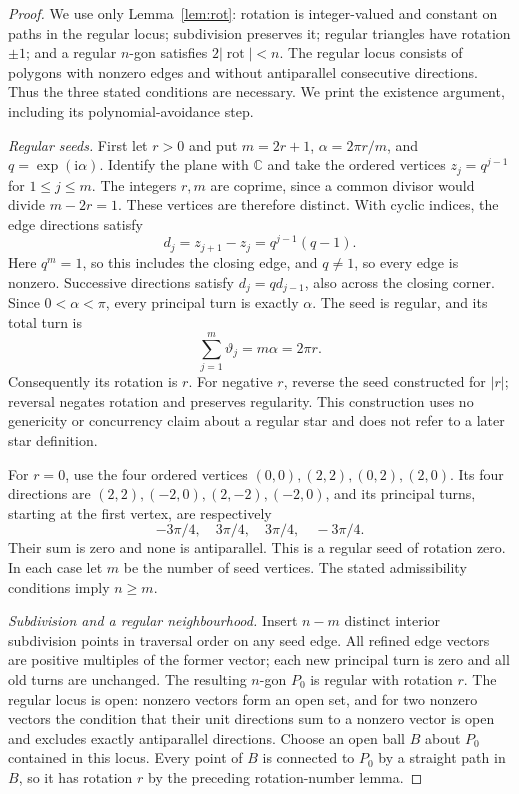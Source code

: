 \begin{proof}\leanok{}
We use only Lemma~\ref{lem:rot}: rotation is
integer-valued and constant on paths in the regular locus; subdivision
preserves it; regular triangles have rotation $\pm1$; and a regular
$n$-gon satisfies $2|\operatorname{rot}|<n$. The regular locus consists
of polygons with nonzero edges and without antiparallel consecutive
directions. Thus the three stated conditions are necessary. We print
the existence argument, including its polynomial-avoidance step.

\emph{Regular seeds.}
First let $r>0$ and put $m=2r+1$, $\alpha=2\pi r/m$, and
$q=\exp(\mathrm i\alpha)$. Identify the plane with $\mathbb C$ and take
the ordered vertices $z_j=q^{j-1}$ for $1\leq j\leq m$.
The integers $r,m$ are coprime, since a common divisor would divide
$m-2r=1$. These vertices are therefore distinct. With cyclic indices,
the edge directions satisfy
\begin{equation}\label{fibpr:directions}
d_j=z_{j+1}-z_j=q^{j-1}(q-1).
\end{equation}
Here $q^m=1$, so this includes the closing edge, and $q\ne1$, so every
edge is nonzero. Successive directions satisfy $d_j=q d_{j-1}$, also
across the closing corner. Since $0<\alpha<\pi$, every principal turn
is exactly $\alpha$. The seed is regular, and its total turn is
\begin{equation}\label{fibpr:rotation}
\sum_{j=1}^{m}\vartheta_j=m\alpha=2\pi r.
\end{equation}
Consequently its rotation is $r$. For negative $r$, reverse the seed
constructed for $|r|$; reversal negates rotation and preserves regularity.
This construction uses no genericity or concurrency claim about a
regular star and does not refer to a later star definition.

For $r=0$, use the four ordered vertices
$(0,0),(2,2),(0,2),(2,0)$. Its four directions are
$(2,2),(-2,0),(2,-2),(-2,0)$, and its principal turns, starting at the
first vertex, are respectively
\begin{equation}\label{fibpr:bowtie}
-3\pi/4,\quad 3\pi/4,\quad 3\pi/4,\quad-3\pi/4.
\end{equation}
Their sum is zero and none is antiparallel. This is a regular seed of
rotation zero. In each case let $m$ be the number of seed vertices.
The stated admissibility conditions imply $n\geq m$.

\emph{Subdivision and a regular neighbourhood.}
Insert $n-m$ distinct interior subdivision points in traversal order
on any seed edge. All refined edge vectors are positive multiples of
the former vector; each new principal turn is zero and all old turns
are unchanged. The resulting $n$-gon $P_0$ is regular with rotation $r$.
The regular locus is open: nonzero vectors form an open set, and for
two nonzero vectors the condition that their unit directions sum to a
nonzero vector is open and excludes exactly antiparallel directions.
Choose an open ball $B$ about $P_0$ contained in this locus.
Every point of $B$ is connected to $P_0$ by a straight path in $B$,
so it has rotation $r$ by the preceding rotation-number lemma.


\end{proof}
